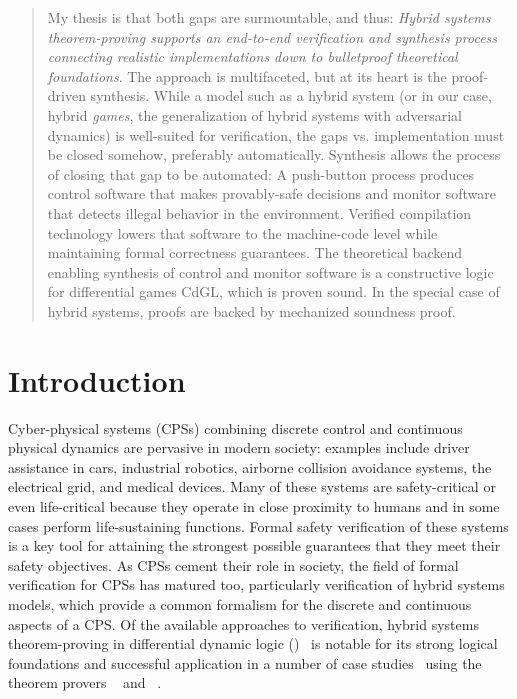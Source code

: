 \documentclass[12pt]{cmuthesis}
\theoremstyle{definition}
\theoremstyle{remark}
\newcommand{\CdGL}{\textsf{CdGL}\xspace}
\begin{document}
\begin{abstract}
My thesis is that both gaps are surmountable, and thus: \emph{Hybrid systems theorem-proving supports an end-to-end verification and synthesis process connecting realistic implementations down to bulletproof theoretical foundations}.
The approach is multifaceted, but at its heart is the proof-driven synthesis.
While a model such as a hybrid system (or in our case, hybrid \emph{games}, the generalization of hybrid systems with adversarial dynamics) is well-suited for verification, the gaps vs. implementation must be closed somehow, preferably automatically.
Synthesis allows the process of closing that gap to be automated: A push-button process produces control software that makes provably-safe decisions and monitor software that detects illegal behavior in the environment.
Verified compilation technology lowers that software to the machine-code level while maintaining formal correctness guarantees.
The theoretical backend enabling synthesis of control and monitor software is a constructive logic for differential games \CdGL, which is proven sound.
In the special case of hybrid systems, proofs are backed by mechanized soundness proof.
\end{abstract}


\pagestyle{plain}

\mainmatter


\chapter{Introduction}
\label{ch:introduction}
Cyber-physical systems (CPSs) combining discrete control and continuous physical dynamics are pervasive in modern society: examples include driver assistance in cars, industrial robotics, airborne collision avoidance systems, the electrical grid, and medical devices.
Many of these systems are safety-critical or even life-critical because they operate in close proximity to humans and in some cases perform life-sustaining functions.
Formal safety verification of these systems is a key tool for attaining the strongest possible guarantees that they meet their safety objectives.
As CPSs cement their role in society, the field of formal verification for CPSs has matured too, particularly verification of hybrid systems models, which provide a common formalism for the discrete and continuous aspects of a CPS.
Of the available approaches to verification, hybrid systems theorem-proving in differential dynamic logic (\dL)~\cite{Platzer18,DBLP:journals/jar/Platzer08,DBLP:journals/jar/Platzer17,DBLP:conf/lics/Platzer12b:TR} is notable for its strong logical foundations and successful application in a number of case studies~\cite{DBLP:conf/emsoft/JeanninGKGSZP15,DBLP:conf/fm/LoosPN11,DBLP:conf/rss/MitschGP13,DBLP:conf/hybrid/PlatzerQ08} using the theorem provers \KeYmaera~\cite{DBLP:conf/cade/PlatzerQ08} and \KeYmaeraX~\cite{DBLP:conf/cade/FultonMQVP15}.
\end{document}
